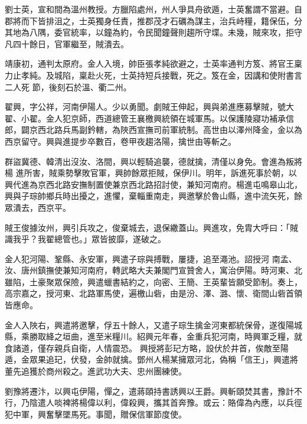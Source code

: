 \begin{pinyinscope}
 劉士英，宣和間為溫州教授。方臘陷處州，州人爭具舟欲遁，士英奮謂不當避。自郡將而下皆排沮之，士英獨身任責，推郡茂才石礪為謀主，治兵峙糧，籍保伍，分其地為八隅，委官統率，以鐘為約，令民聞鐘聲則趨所守堞。未幾，賊來攻，拒守凡四十餘日，官軍繼至，賊潰去。



 靖康初，通判太原府。金人入境，帥臣張孝純欲避之，士英率通判方笈、將官王稟力止孝純。及城陷，稟赴火死，士英持短兵接戰，死之。笈在金，因講和使附書言二人死
 節，後刻石於溫、衢二州。



 翟興，字公祥，河南伊陽人。少以勇聞。劇賊王伸起，興與弟進應募擊賊，號大翟、小翟。金人犯京師，西道總管王襄檄興統領在城軍馬。以保護陵寢功補承信郎，闢京西北路兵馬副鈐轄，為陜西宣撫司前軍統制。高世由以澤州降金，金以為西京留守。興與進提步卒數百，卷甲夜趨洛陽，擒世由等斬之。



 群盜冀德、韓清出沒汝、洛間，興以輕騎追襲，德就擒，清僅以身免。會進為叛將楊
 進所害，賊乘勢擊敗官軍，興帥餘眾拒賊，保伊川。明年，訴進死事於朝，以興代進為京西北路安撫制置使兼京西北路招討使，兼知河南府。楊進屯鳴皋山北，興與子琮帥鄉兵時出擾之，進懼，棄輜重南走，興邀擊於魯山縣，進中流矢死，餘眾潰去，西京平。



 賊王俊據汝州，興引兵攻之，俊棄城去，退保繖蓋山。興進攻，免胄大呼曰：「賊識我乎？我翟總管也。」眾皆披靡，遂破之。



 金人犯河陽、鞏縣、永安軍，興遣子琮與搏戰，屢捷，追至澠池。詔授河
 南孟、汝、唐州鎮撫使兼知河南府，轉武略大夫兼閣門宣贊舍人，寓治伊陽。時河東、北雖陷，土豪聚眾保險，興遣蠟書結約之，向密、王簡、王英輩皆願受節制。奏上，高宗嘉之，授河東、北路軍馬使，遍檄山砦，由是汾、澤、潞、懷、衛間山砦首領皆應命。



 金人入陜右，興遣將邀擊，俘五十餘人，又遣子琮生擒金河東都統保骨，遂復陽城縣，乘勝取絳之垣曲，進至米糧川。紹興元年春，金重兵犯河南，時興軍乏糧，就食諸道，僅存親兵自衛，人情震恐。
 興授將彭玘方略，設伏於井首，俟敵至陽遁，金眾果追玘，伏發，金帥就擒。鄧州人楊某擁眾河北，偽稱「信王」，興遣將董先追獲於商州殺之。進武功大夫、忠州團練使。



 劉豫將遷汴，以興屯伊陽，憚之，遣蔣頤持書誘興以王爵。興斬頤焚其書，豫計不行，乃陰遣人啖裨將楊偉以利，偉殺興，攜其首奔豫。或云：賂偉為內應，以兵徑犯中軍，興奮擊墜馬死。事聞，贈保信軍節度使。




\end{pinyinscope}
